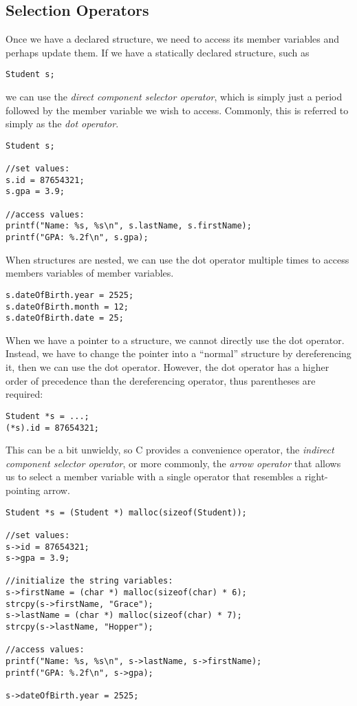 \subsection{Selection Operators}

Once we have a declared structure, we need to access its member
variables and perhaps update them.  If we have a statically declared
structure, such as

\texttt{Student s;} 

we can use the \emph{direct component selector operator}, which is
simply just a period followed by the member variable we wish to 
access.  Commonly, this is referred to simply as the 
 \emph{dot operator}.

\begin{verbatim}
Student s;

//set values:
s.id = 87654321;
s.gpa = 3.9;

//access values:
printf("Name: %s, %s\n", s.lastName, s.firstName);
printf("GPA: %.2f\n", s.gpa);
\end{verbatim}

When structures are nested, we can use the dot operator multiple
times to access members variables of member variables.

\begin{verbatim}
s.dateOfBirth.year = 2525;
s.dateOfBirth.month = 12;
s.dateOfBirth.date = 25;
\end{verbatim}

When we have a pointer to a structure, we cannot directly use
the dot operator.  Instead, we have to change the pointer into
a ``normal'' structure by dereferencing it, then we can use the
dot operator.  However, the dot operator has a higher order of
precedence than the dereferencing operator, thus parentheses are 
required:

\begin{verbatim}
Student *s = ...;
(*s).id = 87654321;
\end{verbatim}

This can be a bit unwieldy, so C provides a convenience operator, 
the \emph{indirect component selector operator}, or more commonly,
the  \emph{arrow operator} that allows us 
to select a member variable
with a single operator that resembles a right-pointing arrow.

\begin{verbatim}
Student *s = (Student *) malloc(sizeof(Student));

//set values:
s->id = 87654321;
s->gpa = 3.9;

//initialize the string variables:
s->firstName = (char *) malloc(sizeof(char) * 6);
strcpy(s->firstName, "Grace");
s->lastName = (char *) malloc(sizeof(char) * 7);
strcpy(s->lastName, "Hopper");

//access values:
printf("Name: %s, %s\n", s->lastName, s->firstName);
printf("GPA: %.2f\n", s->gpa);

s->dateOfBirth.year = 2525;
\end{verbatim}

